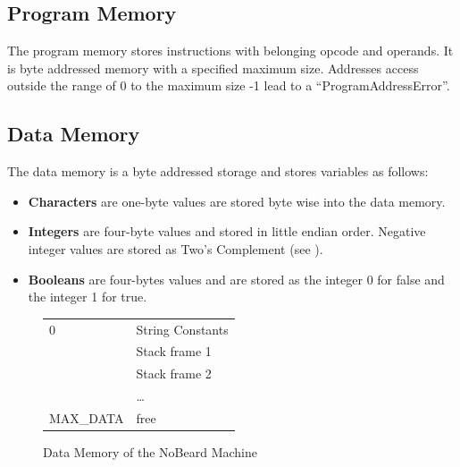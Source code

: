 \subsection{Program Memory}
The program memory stores instructions with  belonging opcode and operands.  It is byte addressed memory with a specified maximum size. Addresses access outside the range of 0 to the maximum size -1 lead to a “ProgramAddressError”. 

\subsection{Data Memory} \label{ssec:dataMemory} 
The data memory is a byte addressed storage and stores variables as follows:

\begin{itemize}
\item \textbf{Characters} are one-byte values are stored byte wise into the data memory. 
\item \textbf{Integers }are four-byte values and stored in little endian order. Negative integer values are stored as Two’s Complement (see \cite{wikipedia_twos_2018}).
\item \textbf{Booleans }are four-bytes values and are stored as the integer 0 for false and the integer 1 for true.
\end{itemize}

\begin{figure}
\begin{center}
\begin{tabular}{p{8em}|p{8em}|}
\cline{2-2}
\parbox[t][3em][t]{8em}{\hfill 0} & String Constants \\[3em] 
& Stack frame 1 \\[2em] 
& Stack frame 2 \\[2em] 
& \ldots \\[2em] 
\parbox[b][4em][b]{8em}{\hfill MAX\_DATA} & free \\ 
\end{tabular}
\end{center}
\caption{Data Memory of the NoBeard Machine}\label{fig:datamemory}
\end{figure}

